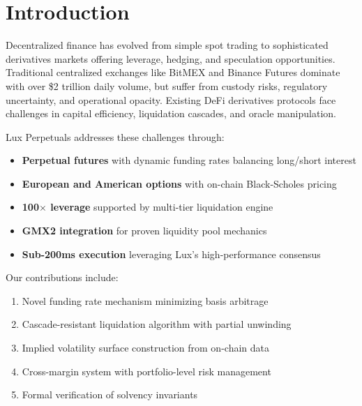 \section{Introduction}


Decentralized finance has evolved from simple spot trading to sophisticated derivatives markets offering leverage, hedging, and speculation opportunities. Traditional centralized exchanges like BitMEX and Binance Futures dominate with over \$2 trillion daily volume, but suffer from custody risks, regulatory uncertainty, and operational opacity. Existing DeFi derivatives protocols face challenges in capital efficiency, liquidation cascades, and oracle manipulation.

Lux Perpetuals addresses these challenges through:
\begin{itemize}
    \item \textbf{Perpetual futures} with dynamic funding rates balancing long/short interest
    \item \textbf{European and American options} with on-chain Black-Scholes pricing
    \item \textbf{100$\times$ leverage} supported by multi-tier liquidation engine
    \item \textbf{GMX2 integration} for proven liquidity pool mechanics
    \item \textbf{Sub-200ms execution} leveraging Lux's high-performance consensus
\end{itemize}

Our contributions include:
\begin{enumerate}
    \item Novel funding rate mechanism minimizing basis arbitrage
    \item Cascade-resistant liquidation algorithm with partial unwinding
    \item Implied volatility surface construction from on-chain data
    \item Cross-margin system with portfolio-level risk management
    \item Formal verification of solvency invariants
\end{enumerate}

